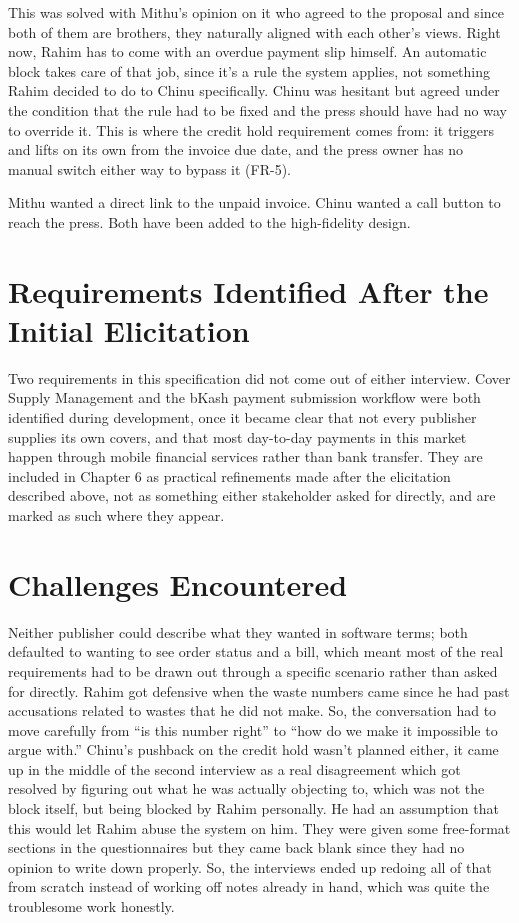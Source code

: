 \documentclass{scrreprt}
\begin{document}
This was solved with Mithu's opinion on it who agreed to the proposal and since both of them are brothers, they naturally aligned with each other's views. Right now, Rahim has to come with an overdue payment slip himself. An automatic block takes care of that job, since it's a rule the system applies, not something Rahim decided to do to Chinu specifically. Chinu was hesitant but agreed under the condition that the rule had to be fixed and the press should have had no way to override it. This is where the credit hold requirement comes from: it triggers and lifts on its own from the invoice due date, and the press owner has no manual switch either way to bypass it (FR-5).

Mithu wanted a direct link to the unpaid invoice. Chinu wanted a call button to reach the press. Both have been added to the high-fidelity design.

\section{Requirements Identified After the Initial Elicitation}
Two requirements in this specification did not come out of either interview. Cover Supply Management and the bKash payment submission workflow were both identified during development, once it became clear that not every publisher supplies its own covers, and that most day-to-day payments in this market happen through mobile financial services rather than bank transfer. They are included in Chapter 6 as practical refinements made after the elicitation described above, not as something either stakeholder asked for directly, and are marked as such where they appear.

\section{Challenges Encountered}
Neither publisher could describe what they wanted in software terms; both defaulted to wanting to see order status and a bill, which meant most of the real requirements had to be drawn out through a specific scenario rather than asked for directly. Rahim got defensive when the waste numbers came since he had past accusations related to wastes that he did not make. So, the conversation had to move carefully from ``is this number right'' to ``how do we make it impossible to argue with.'' Chinu's pushback on the credit hold wasn't planned either, it came up in the middle of the second interview as a real disagreement which got resolved by figuring out what he was actually objecting to, which was not the block itself, but being blocked by Rahim personally. He had an assumption that this would let Rahim abuse the system on him. They were given some free-format sections in the questionnaires but they came back blank since they had no opinion to write down properly. So, the interviews ended up redoing all of that from scratch instead of working off notes already in hand, which was quite the troublesome work honestly.
\end{document}
